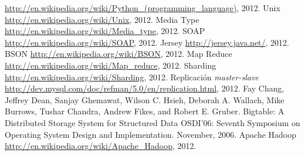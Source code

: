 \documentclass[a4paper,12pt,twoside]{report}
\begin{document}
\begin{thebibliography}{1}
  \newblock
  \url{http://en.wikipedia.org/wiki/Python_(programming_language)}, 2012.
  \newblock Unix
  \newblock \url{http://en.wikipedia.org/wiki/Unix}, 2012.
  \newblock Media Type
  \newblock \url{http://en.wikipedia.org/wiki/Media_type}, 2012.
  \newblock SOAP
  \newblock \url{http://en.wikipedia.org/wiki/SOAP}, 2012.
  \newblock Jersey
  \newblock \url{http://jersey.java.net/}, 2012.
  \newblock BSON
  \newblock \url{http://en.wikipedia.org/wiki/BSON}, 2012.
  \newblock Map Reduce
  \newblock \url{http://en.wikipedia.org/wiki/Map_reduce}, 2012.
  \newblock Sharding
  \newblock \url{http://en.wikipedia.org/wiki/Sharding}, 2012.
  \newblock Replicación \emph{master-slave}
  \newblock
  \url{http://dev.mysql.com/doc/refman/5.0/en/replication.html}, 2012.
  Fay Chang, Jeffrey Dean, Sanjay Ghemawat, Wilson C. Hsieh, Deborah A. Wallach, Mike Burrows, Tushar Chandra, Andrew Fikes, and Robert E. Gruber.
  \newblock Bigtable: A Distributed Storage System for Structured Data
  \newblock OSDI'06: Seventh Symposium on Operating System Design and
  Implementation. November, 2006.
  \newblock Apache Hadoop
  \newblock \url{http://en.wikipedia.org/wiki/Apache_Hadoop}, 2012.

\end{thebibliography}
\end{document}
